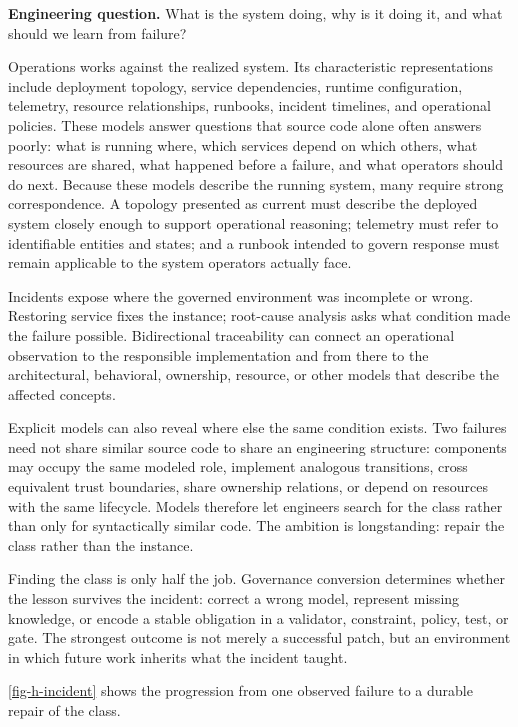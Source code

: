 

\textbf{Engineering question.} What is the system doing, why is it doing it, and what should we learn from failure?

Operations works against the realized system. Its characteristic representations include deployment topology, service dependencies, runtime configuration, telemetry, resource relationships, runbooks, incident timelines, and operational policies. These models answer questions that source code alone often answers poorly: what is running where, which services depend on which others, what resources are shared, what happened before a failure, and what operators should do next. Because these models describe the running system, many require strong correspondence. A topology presented as current must describe the deployed system closely enough to support operational reasoning; telemetry must refer to identifiable entities and states; and a runbook intended to govern response must remain applicable to the system operators actually face.

Incidents expose where the governed environment was incomplete or wrong. Restoring service fixes the instance; root-cause analysis asks what condition made the failure possible. Bidirectional traceability can connect an operational observation to the responsible implementation and from there to the architectural, behavioral, ownership, resource, or other models that describe the affected concepts.

Explicit models can also reveal where else the same condition exists. Two failures need not share similar source code to share an engineering structure: components may occupy the same modeled role, implement analogous transitions, cross equivalent trust boundaries, share ownership relations, or depend on resources with the same lifecycle. Models therefore let engineers search for the class rather than only for syntactically similar code. The ambition is longstanding: repair the class rather than the instance.

Finding the class is only half the job. Governance conversion determines whether the lesson survives the incident: correct a wrong model, represent missing knowledge, or encode a stable obligation in a validator, constraint, policy, test, or gate. The strongest outcome is not merely a successful patch, but an environment in which future work inherits what the incident taught.

\autoref{fig-h-incident} shows the progression from one observed failure to a durable repair of the class.

